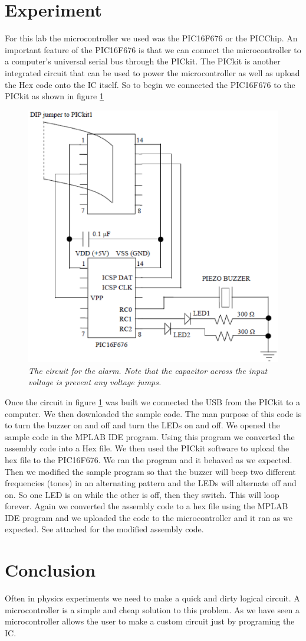 \documentclass[11pt]{article}
\numberwithin{equation}{section}
\numberwithin{figure}{section}
\numberwithin{table}{section}
\begin{document}
\section{Experiment}
For this lab the microcontroller we used was the PIC16F676 or the PICChip. An important feature of the PIC16F676 is that we can connect the microcontroller to a computer's universal serial bus through the PICkit. The PICkit is another integrated circuit that can be used to power the microcontroller as well as upload the Hex code onto the IC itself. So to begin we connected the PIC16F676 to the PICkit as shown in figure \ref{FigSchem}
\begin{figure}[h]
\centering
\includegraphics[scale=0.60]{FigSchem.eps}
\caption{\textit{The circuit for the alarm. Note that the capacitor across the input voltage is prevent any voltage jumps.}}
\label{FigSchem}
\end{figure} 

Once the circuit in figure \ref{FigSchem} was built we connected the USB from the PICkit to a computer. We then downloaded the sample code. The man purpose of this code is to turn the buzzer on and off and turn the LEDs on and off. We opened the sample code in the MPLAB IDE program. Using this program we converted the assembly code into a Hex file. We then used the PICkit software to upload the hex file to the PIC16F676. We ran the program and it behaved as we expected. Then we modified the sample program so that the buzzer will beep two different frequencies (tones) in an alternating pattern and the LEDs will alternate off and on. So one LED is on while the other is off, then they switch. This will loop forever. Again we converted the assembly code to a hex file using the MPLAB IDE program and we uploaded the code to the microcontroller and it ran as we expected. See attached for the modified assembly code.


\section{Conclusion}
Often in physics experiments we need to make a quick and dirty logical circuit. A microcontroller is a simple and cheap solution to this problem. As we have seen a microcontroller allows the user to make a custom circuit just by programing the IC.
\end{document}
